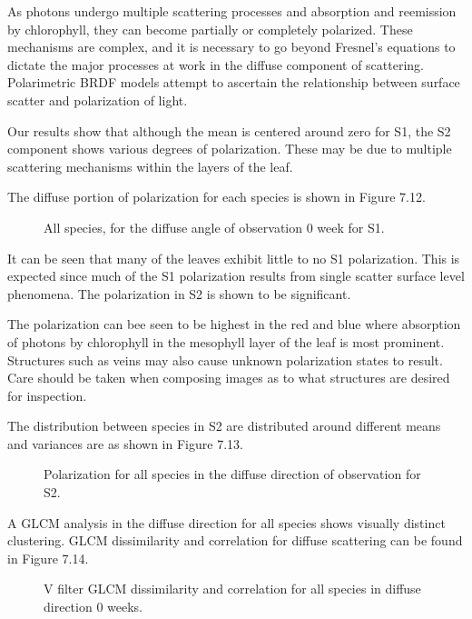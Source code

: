 As photons undergo multiple scattering processes and absorption and reemission by chlorophyll, they can become partially or completely polarized.  These mechanisms are complex, and it is necessary to go beyond Fresnel’s equations to dictate the major processes at work in the diffuse component of scattering.  Polarimetric BRDF models attempt to ascertain the relationship between surface scatter and polarization of light.

Our results show that although the mean is centered around zero for S1, the S2 component shows various degrees of polarization.  These may be due to multiple scattering mechanisms within the layers of the leaf.

The diffuse portion of polarization for each species is shown in Figure 7.12.
%
\begin{sidewaysfigure}
    \begin{center}
    \end{center}
    \caption{All species, for the diffuse angle of observation 0 week for S1.}
    \label{fig:polarization}
\end{sidewaysfigure}
%
It can be seen that many of the leaves exhibit little to no S1 polarization.  This is expected since much of the S1 polarization results from single scatter surface level phenomena.  The polarization in S2 is shown to be significant.

The polarization can bee seen to be highest in the red and blue where absorption of photons by chlorophyll in the mesophyll layer of the leaf is most prominent.  Structures such as veins may also cause unknown polarization states to result.  Care should be taken when composing images as to what structures are desired for inspection.

The distribution between species in S2 are distributed around different means and variances are as shown in Figure 7.13.
%
\begin{sidewaysfigure}
    \begin{center}
    \end{center}
    \caption{Polarization for all species in the diffuse direction of observation for S2.}
    \label{fig:polarization}
\end{sidewaysfigure}
%
A GLCM analysis in the diffuse direction for all species shows visually distinct clustering.  GLCM dissimilarity and correlation for diffuse scattering can be found in Figure 7.14.
%
\begin{figure}
    \begin{center}
    \end{center}
    \caption{V filter GLCM dissimilarity and correlation for all species in diffuse direction 0 weeks.}
    \label{fig:polarization}
\end{figure}
%
